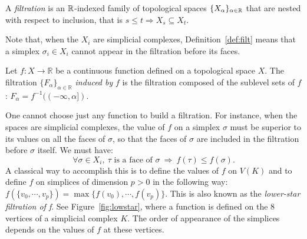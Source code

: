 \begin{defin} \label{def:filt}
A {\em filtration} 
is an $\mathbb{R}$-indexed family of topological spaces  $\{X_{\alpha}\}_{\alpha\in\mathbb{R}}$ 
that are nested with respect to  inclusion, %
that is $s\leq t\Rightarrow X_s\subseteq X_t$.
\end{defin} 

Note that, when the $X_{i}$ are simplicial complexes, %
Definition~\ref{def:filt} means that a simplex $\sigma_{i}\in X_i$ cannot appear in the filtration before its faces.



\begin{defin} 
Let $f:X\rightarrow\mathbb{R}$ be a continuous function defined on a topological space $X$. 
The filtration $\{F_{\alpha}\}_{\alpha\in\mathbb{R}}$ {\em induced by} $f$ is the filtration 
composed of the sublevel sets of $f$: %
$F_{\alpha}=f^{-1}((-\infty,\alpha])$.
\end{defin}

One cannot choose just any function to build a filtration. For instance, when the spaces are simplicial complexes, 
the value of $f$ on a  simplex $\sigma$ must be superior to its values on all the faces of $\sigma$, so that 
the faces of $\sigma$ are included in the filtration before $\sigma$ itself. We must have: 
$$\forall\sigma\in X_i,\ \tau\text{ is a face of }\sigma\ \Rightarrow\ f(\tau)\leq f(\sigma).$$ 
A classical way to accomplish this is to define the values of $f$ on $V(K)$ and to define $f$ on simplices of dimension $p>0$
in the following way: $f(\{v_0,\cdots,v_p\})=\max\{f(v_0),\cdots, f(v_p)\}$. 
This is also known as the \textit{lower-star filtration of f}. See Figure~\ref{fig:lowstar}, where a function 
is defined on the 8 vertices of a simplicial complex $K$. The order of appearance of 
the simplices depends on the values of $f$ at these vertices. 

